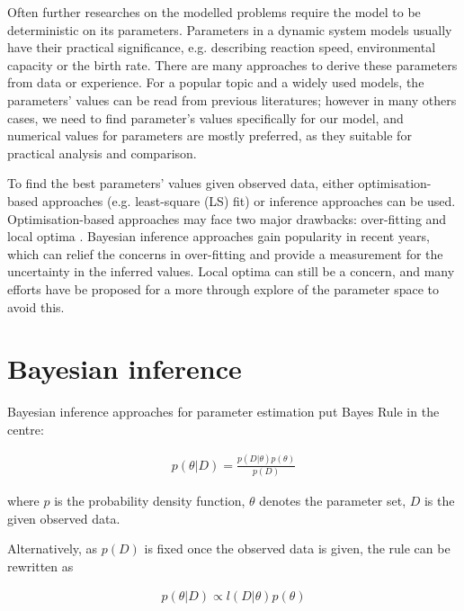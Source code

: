 Often further researches on the modelled problems require the model to be deterministic on its parameters. Parameters in a dynamic system models usually have their practical significance, e.g. describing reaction speed, environmental capacity or the birth rate. There are many approaches to derive these parameters from data or experience. For a popular topic and a widely used models, the parameters' values can be read from previous literatures; however in many others cases, we need to find parameter's values specifically for our model, and numerical values for parameters are mostly preferred, as they suitable for practical analysis and comparison.

To find the best parameters' values given observed data, either optimisation-based approaches (e.g. least-square (LS) fit) or inference approaches can be used. Optimisation-based approaches may face two major drawbacks: over-fitting and local optima \cite{ref:abcsysbio}. Bayesian inference approaches gain popularity in recent years, which can relief the concerns in over-fitting and provide a measurement for the uncertainty in the inferred values. Local optima can still be a concern, and many efforts have be proposed for a more through explore of the parameter space to avoid this.



\section{Bayesian inference}





 Bayesian inference approaches for parameter estimation put Bayes Rule in the centre:

 \begin{align}
    \label{eq:bayes}
    p(\theta|D) = \frac{p(D|\theta)p(\theta)}{p(D)}
\end{align}

where $p$ is the probability density function, $\theta$ denotes the parameter set, $D$ is the given observed data.

Alternatively, as $p(D)$ is fixed once the observed data is given, the rule can be rewritten as 

\begin{align}
    \label{eq:bayes2}
    p(\theta|D) \propto l(D|\theta)p(\theta)
\end{align}

